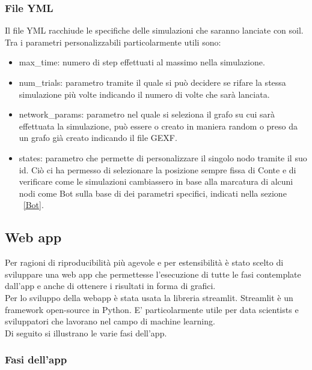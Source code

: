         \subsubsection{File YML}
        Il file YML racchiude le specifiche delle simulazioni che saranno lanciate con soil.\\
        Tra i parametri personalizzabili particolarmente utili sono:
        \begin{itemize}
          \item max\_time: numero di step effettuati al massimo nella simulazione.
          \item num\_trials: parametro tramite il quale si può decidere se rifare la stessa simulazione più volte indicando il numero di volte che sarà lanciata.
          \item network\_params: parametro nel quale si seleziona il grafo su cui sarà effettuata la simulazione, può essere o creato in maniera random o preso da un grafo già creato indicando il file GEXF.
          \item states: parametro che permette di personalizzare il singolo nodo tramite il suo id. Ciò ci ha permesso di selezionare la posizione sempre fissa di Conte e di verificare come le simulazioni cambiassero in base alla marcatura di alcuni nodi come Bot sulla base di dei parametri specifici, indicati nella sezione ~\ref{Bot}.
        \end{itemize}

    \subsection{Web app}
      Per ragioni di riproducibilità più agevole e per estensibilità è stato scelto di sviluppare una web app che permettesse l’esecuzione di tutte le fasi contemplate dall’app e anche di ottenere i risultati in forma di grafici.\\
      Per lo sviluppo della webapp è stata usata la libreria streamlit. Streamlit è un framework open-source in Python. E’ particolarmente utile per data scientists e sviluppatori che lavorano nel campo di machine learning.\\

      Di seguito si illustrano le varie fasi dell’app.
        \subsubsection{Fasi dell'app}
          
